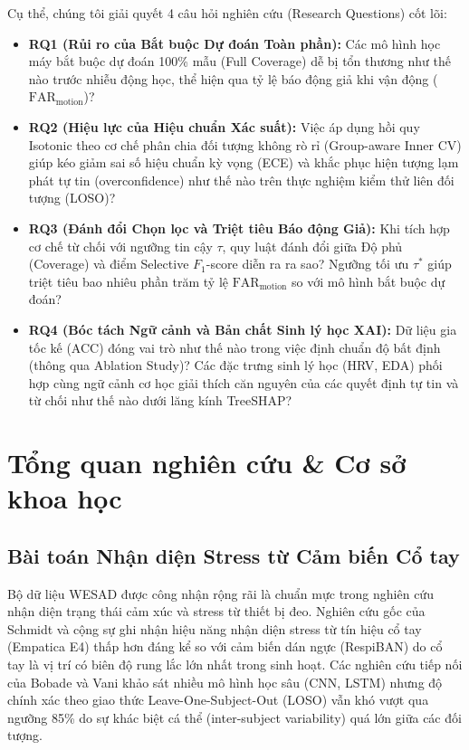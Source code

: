 \documentclass[conference]{IEEEtran}
\begin{document}
Cụ thể, chúng tôi giải quyết 4 câu hỏi nghiên cứu (Research Questions) cốt lõi:
\begin{itemize}
    \item \textbf{RQ1 (Rủi ro của Bắt buộc Dự đoán Toàn phần):} Các mô hình học máy bắt buộc dự đoán 100\% mẫu (Full Coverage) dễ bị tổn thương như thế nào trước nhiễu động học, thể hiện qua tỷ lệ báo động giả khi vận động ($\text{FAR}_{\text{motion}}$)?
    \item \textbf{RQ2 (Hiệu lực của Hiệu chuẩn Xác suất):} Việc áp dụng hồi quy Isotonic theo cơ chế phân chia đối tượng không rò rỉ (Group-aware Inner CV) giúp kéo giảm sai số hiệu chuẩn kỳ vọng (ECE) và khắc phục hiện tượng lạm phát tự tin (overconfidence) như thế nào trên thực nghiệm kiểm thử liên đối tượng (LOSO)?
    \item \textbf{RQ3 (Đánh đổi Chọn lọc và Triệt tiêu Báo động Giả):} Khi tích hợp cơ chế từ chối với ngưỡng tin cậy $\tau$, quy luật đánh đổi giữa Độ phủ (Coverage) và điểm Selective $F_1$-score diễn ra ra sao? Ngưỡng tối ưu $\tau^*$ giúp triệt tiêu bao nhiêu phần trăm tỷ lệ $\text{FAR}_{\text{motion}}$ so với mô hình bắt buộc dự đoán?
    \item \textbf{RQ4 (Bóc tách Ngữ cảnh và Bản chất Sinh lý học XAI):} Dữ liệu gia tốc kế (ACC) đóng vai trò như thế nào trong việc định chuẩn độ bất định (thông qua Ablation Study)? Các đặc trưng sinh lý học (HRV, EDA) phối hợp cùng ngữ cảnh cơ học giải thích căn nguyên của các quyết định tự tin và từ chối như thế nào dưới lăng kính TreeSHAP?
\end{itemize}

\section{Tổng quan nghiên cứu \& Cơ sở khoa học}

\subsection{Bài toán Nhận diện Stress từ Cảm biến Cổ tay}
Bộ dữ liệu WESAD \cite{schmidt2018wesad} được công nhận rộng rãi là chuẩn mực trong nghiên cứu nhận diện trạng thái cảm xúc và stress từ thiết bị đeo. Nghiên cứu gốc của Schmidt và cộng sự ghi nhận hiệu năng nhận diện stress từ tín hiệu cổ tay (Empatica E4) thấp hơn đáng kể so với cảm biến dán ngực (RespiBAN) do cổ tay là vị trí có biên độ rung lắc lớn nhất trong sinh hoạt. Các nghiên cứu tiếp nối của Bobade và Vani \cite{bobade2020stress} khảo sát nhiều mô hình học sâu (CNN, LSTM) nhưng độ chính xác theo giao thức Leave-One-Subject-Out (LOSO) vẫn khó vượt qua ngưỡng 85\% do sự khác biệt cá thể (inter-subject variability) quá lớn giữa các đối tượng.
\end{document}
